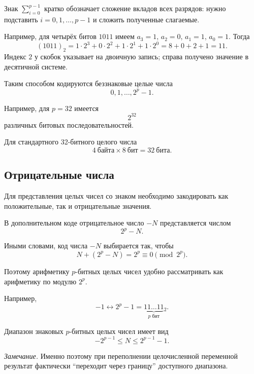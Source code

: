 \documentclass[../final.tex]{subfiles}
\begin{document}
Знак $\sum_{i=0}^{p-1}$ кратко обозначает сложение вкладов всех
разрядов: нужно подставить $i=0,1,\ldots,p-1$ и сложить
полученные слагаемые.

Например, для четырёх битов $1011$ имеем
$a_3=1$, $a_2=0$, $a_1=1$, $a_0=1$. Тогда
%
\[
    (1011)_2
    =1\cdot2^3+0\cdot2^2+1\cdot2^1+1\cdot2^0
    =8+0+2+1=11.
\]
%
Индекс $2$ у скобок указывает на двоичную запись;
справа получено значение в десятичной системе.

Таким способом кодируются беззнаковые целые числа
%
\[
    0,1,\ldots,2^p-1.
\]

Например, для $p=32$ имеется
%
\[
    2^{32}
\]
%
различных битовых последовательностей.

Для стандартного 32-битного целого числа
%
\[
    4\ \text{байта}\times8\ \text{бит}
    =
    32\ \text{бита}.
\]


\subsection{Отрицательные числа}

Для представления целых чисел со знаком необходимо закодировать
как положительные, так и отрицательные значения.

В дополнительном коде отрицательное число $-N$ представляется
числом
%
\begin{equation*}
    2^p-N.
\end{equation*}

Иными словами, код числа $-N$ выбирается так, чтобы
%
\begin{equation*}
    N + (2^p-N)
    =
    2^p
    \equiv
    0
    \pmod{2^p}.
\end{equation*}

Поэтому арифметику $p$-битных целых чисел удобно рассматривать
как арифметику по модулю $2^p$.

Например,
%
\begin{equation*}
    -1
    \longleftrightarrow
    2^p-1
    =
    \underbrace{11\ldots11}_{p\text{ бит}}{}_2 .
\end{equation*}

Диапазон знаковых $p$-битных целых чисел имеет вид
%
\begin{equation*}
    -2^{p-1}
    \leq
    N
    \leq
    2^{p-1}-1.
\end{equation*}

\textit{Замечание.}
Именно поэтому при переполнении целочисленной переменной
результат фактически ``переходит через границу'' доступного
диапазона.
\end{document}
